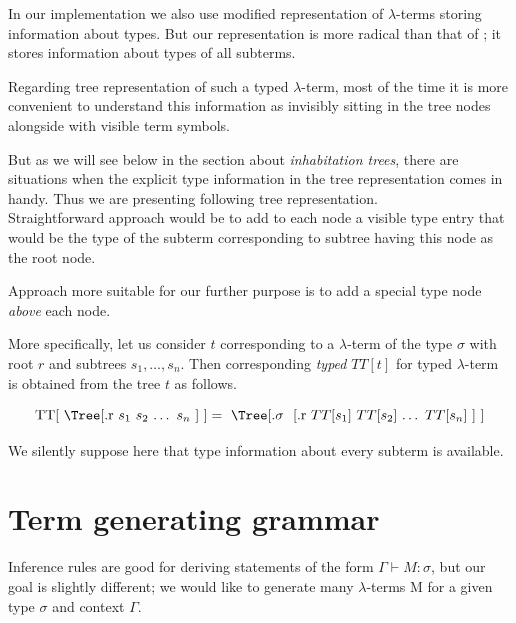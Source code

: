 \documentclass[12pt,a4paper]{report}
\newcommand{\lets}{let us\xspace}
\newcommand{\lterm}{$\lambda$-term\xspace}
\newcommand{\lterms}{$\lambda$-terms\xspace}
\newcommand{\turst}[3]{$#1\vdash{}#2:#3$\xspace}
\newcommand{\GMS}{\turst{\Gamma}{M}{\sigma}}
\begin{document}
In our implementation we also use modified representation of \lterms
storing information about types. But our representation is more 
radical than that of \lsChurch; it stores information about types
of all subterms.

Regarding tree representation of such a typed
\lterm, most of the time it is more convenient to 
understand this information as invisibly sitting
in the tree nodes alongside with visible
term symbols.

But as we will see below in the section about \textit{inhabitation trees},
there are situations when the explicit type information in the tree representation
comes in handy. Thus we are presenting following tree representation.\\


Straightforward approach would be to add to each node a visible type entry 
that would be the type of the subterm corresponding to subtree having this
node as the root node. 

Approach more suitable for our further purpose 
is to add a special type node \textit{above} each node.

More specifically,
\lets consider \textit{\sexprTree} $t$ corresponding to a \lterm of the type
$\sigma$ with root $r$ and subtrees $s_1 , \dots , s_n$. 
Then corresponding \textit{typed \sexprTree} $TT[t]$ for typed \lterm is 
obtained from the tree $t$ as follows.  

\begin{equation*}
\mbox{ 
TT[ 
\Tree
	[.r 	
	  	  \text{$s_1$}
		  \text{$s_2$}
		  \text{$\dots$}
		  \text{$s_n$}
	] 
]} =
\mbox{
\Tree
	[.\text{$\sigma$ }
	    [.r 	
	  	  \text{$TT[s_1]$}
		  \text{$TT[s_2]$}
		  \text{$\dots$}
		  \text{$TT[s_n]$}
		]	  	
	] 
}
\end{equation*}

We silently suppose here that type information about every subterm is available.




\section{Term generating grammar}
\label{Term-generating-grammar}

\newcommand{\gar}{\longmapsto}

Inference rules are good for deriving statements of the form \GMS, but our
goal is slightly different; we would like to generate many \lterms M for a given type 
$\sigma$ and context $\Gamma$.\\
\end{document}
